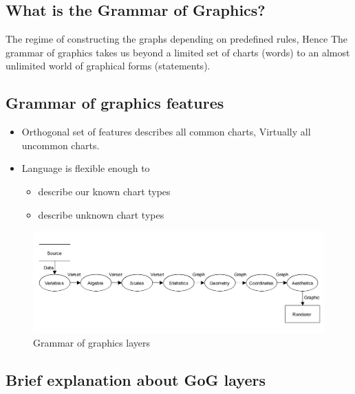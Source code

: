 \documentclass[12pt]{article}
\begin{document}
\subsection{What is the Grammar of Graphics?}
The regime of constructing the graphs depending on predefined rules, Hence 
The grammar of graphics takes us beyond a limited set of charts (words) to an almost unlimited world of graphical forms (statements).
\subsection{Grammar of graphics features}
\begin{itemize}
\item Orthogonal set of features describes all common charts, Virtually all uncommon charts.
\item Language is flexible enough to
\begin{itemize}
\item describe our known chart types
\item describe unknown chart types
\end{itemize}
\end{itemize}
\begin{figure}[h!]
\caption{Grammar of graphics layers}
\includegraphics[width=\textwidth]{pre9}
\end{figure}
\newpage
\subsection{Brief explanation about GoG layers}
\end{document}
